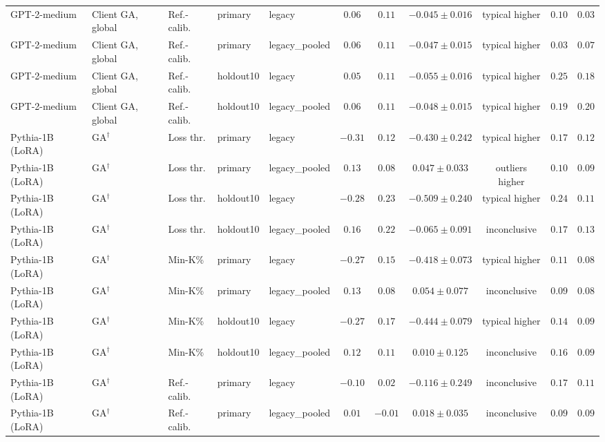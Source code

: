 {\begin{longtable}{@{\extracolsep{\fill}}lllllcccccc@{}}
GPT-2-medium & Client GA, global & Ref.-calib. & primary & legacy & $0.06$ & $0.11$ & $-0.045 \pm 0.016$ & typical higher & $0.10$ & $0.03$ \\
GPT-2-medium & Client GA, global & Ref.-calib. & primary & legacy\_pooled & $0.06$ & $0.11$ & $-0.047 \pm 0.015$ & typical higher & $0.03$ & $0.07$ \\
GPT-2-medium & Client GA, global & Ref.-calib. & holdout10 & legacy & $0.05$ & $0.11$ & $-0.055 \pm 0.016$ & typical higher & $0.25$ & $0.18$ \\
GPT-2-medium & Client GA, global & Ref.-calib. & holdout10 & legacy\_pooled & $0.06$ & $0.11$ & $-0.048 \pm 0.015$ & typical higher & $0.19$ & $0.20$ \\
Pythia-1B (LoRA) & GA$^{\dagger}$ & Loss thr. & primary & legacy & $-0.31$ & $0.12$ & $-0.430 \pm 0.242$ & typical higher & $0.17$ & $0.12$ \\
Pythia-1B (LoRA) & GA$^{\dagger}$ & Loss thr. & primary & legacy\_pooled & $0.13$ & $0.08$ & $0.047 \pm 0.033$ & outliers higher & $0.10$ & $0.09$ \\
Pythia-1B (LoRA) & GA$^{\dagger}$ & Loss thr. & holdout10 & legacy & $-0.28$ & $0.23$ & $-0.509 \pm 0.240$ & typical higher & $0.24$ & $0.11$ \\
Pythia-1B (LoRA) & GA$^{\dagger}$ & Loss thr. & holdout10 & legacy\_pooled & $0.16$ & $0.22$ & $-0.065 \pm 0.091$ & inconclusive & $0.17$ & $0.13$ \\
Pythia-1B (LoRA) & GA$^{\dagger}$ & Min-K\% & primary & legacy & $-0.27$ & $0.15$ & $-0.418 \pm 0.073$ & typical higher & $0.11$ & $0.08$ \\
Pythia-1B (LoRA) & GA$^{\dagger}$ & Min-K\% & primary & legacy\_pooled & $0.13$ & $0.08$ & $0.054 \pm 0.077$ & inconclusive & $0.09$ & $0.08$ \\
Pythia-1B (LoRA) & GA$^{\dagger}$ & Min-K\% & holdout10 & legacy & $-0.27$ & $0.17$ & $-0.444 \pm 0.079$ & typical higher & $0.14$ & $0.09$ \\
Pythia-1B (LoRA) & GA$^{\dagger}$ & Min-K\% & holdout10 & legacy\_pooled & $0.12$ & $0.11$ & $0.010 \pm 0.125$ & inconclusive & $0.16$ & $0.09$ \\
Pythia-1B (LoRA) & GA$^{\dagger}$ & Ref.-calib. & primary & legacy & $-0.10$ & $0.02$ & $-0.116 \pm 0.249$ & inconclusive & $0.17$ & $0.11$ \\
Pythia-1B (LoRA) & GA$^{\dagger}$ & Ref.-calib. & primary & legacy\_pooled & $0.01$ & $-0.01$ & $0.018 \pm 0.035$ & inconclusive & $0.09$ & $0.09$ \\

\end{longtable}}
